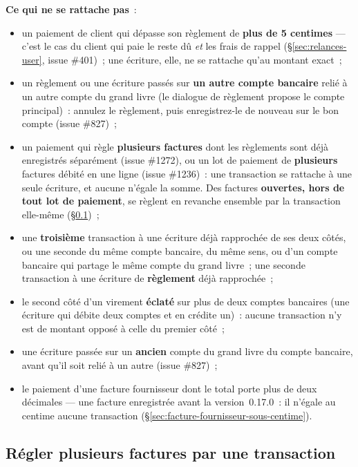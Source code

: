 \documentclass[a4paper,11pt,oneside]{article}
\begin{document}
\textbf{Ce qui ne se rattache pas}~:
\begin{itemize}
    \item un paiement de client qui dépasse son règlement de \textbf{plus de 5 centimes} --- c'est le cas du client qui paie le reste dû \emph{et} les frais de rappel (\S\ref{sec:relances-user}, issue \#401)~; une écriture, elle, ne se rattache qu'au montant exact~;
    \item un règlement ou une écriture passés sur \textbf{un autre compte bancaire} relié à un autre compte du grand livre (le dialogue de règlement propose le compte principal)~: annulez le règlement, puis enregistrez-le de nouveau sur le bon compte (issue \#827)~;
    \item un paiement qui règle \textbf{plusieurs factures} dont les règlements sont déjà enregistrés séparément (issue \#1272), ou un lot de paiement de \textbf{plusieurs} factures débité en une ligne (issue \#1236)~: une transaction se rattache à une seule écriture, et aucune n'égale la somme. Des factures \textbf{ouvertes, hors de tout lot de paiement}, se règlent en revanche ensemble par la transaction elle-même (\S\ref{sec:reglement-groupe})~;
    \item une \textbf{troisième} transaction à une écriture déjà rapprochée de ses deux côtés, ou une seconde du même compte bancaire, du même sens, ou d'un compte bancaire qui partage le même compte du grand livre~; une seconde transaction à une écriture de \textbf{règlement} déjà rapprochée~;
    \item le second côté d'un virement \textbf{éclaté} sur plus de deux comptes bancaires (une écriture qui débite deux comptes et en crédite un)~: aucune transaction n'y est de montant opposé à celle du premier côté~;
    \item une écriture passée sur un \textbf{ancien} compte du grand livre du compte bancaire, avant qu'il soit relié à un autre (issue \#827)~;
    \item le paiement d'une facture fournisseur dont le total porte plus de deux décimales --- une facture enregistrée avant la version~0.17.0~: il n'égale au centime aucune transaction (\S\ref{sec:facture-fournisseur-sous-centime}).
\end{itemize}

\subsection{Régler plusieurs factures par une transaction}\label{sec:reglement-groupe}
\end{document}
